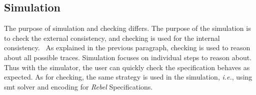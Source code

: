 \subsection{Simulation}
The purpose of simulation and checking differs. The purpose of the simulation is
to check the external consistency, and checking is used for the internal
consistency.~\cite[p.~5]{stoel_storm_vinju_bosman_2016} As explained in the
previous paragraph, checking is used to reason about all possible traces.
Simulation focuses on individual steps to reason about. Thus with the simulator,
the user can quickly check the specification behaves as expected. As for
checking, the same strategy is used in the simulation, \textit{i.e.}, using
\gls{smt} solver and encoding for \textit{Rebel} Specifications.
